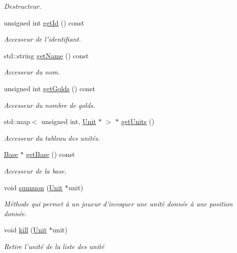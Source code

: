 \begin{DoxyCompactItemize}
\begin{DoxyCompactList}\small\item\em Destructeur. \end{DoxyCompactList}\item 
unsigned int \hyperlink{classPlayer_a6e7e67674bf8f2896cff3ef7f4fa7e0d}{get\+Id} () const 
\begin{DoxyCompactList}\small\item\em Accesseur de l'identifiant. \end{DoxyCompactList}\item 
std\+::string \hyperlink{classPlayer_ad4c6a95f1cf69c44d0c585465b101c70}{get\+Name} () const 
\begin{DoxyCompactList}\small\item\em Accesseur du nom. \end{DoxyCompactList}\item 
unsigned int \hyperlink{classPlayer_a5a300fd8e477c6d9f19266763970daaf}{get\+Golds} () const 
\begin{DoxyCompactList}\small\item\em Accesseur du nombre de golds. \end{DoxyCompactList}\item 
std\+::map$<$ unsigned int, \hyperlink{classUnit}{Unit} $\ast$ $>$ $\ast$ \hyperlink{classPlayer_a1184d2d25acc16958d0e7710fe0f00ec}{get\+Units} ()
\begin{DoxyCompactList}\small\item\em Accesseur du tableau des unités. \end{DoxyCompactList}\item 
\hyperlink{classBase}{Base} $\ast$ \hyperlink{classPlayer_a1a3f0608b817489ecce50a53da619270}{get\+Base} () const 
\begin{DoxyCompactList}\small\item\em Accesseur de la base. \end{DoxyCompactList}\item 
void \hyperlink{classPlayer_a8963d12d2c4e47cd073ed9829dd86c79}{summon} (\hyperlink{classUnit}{Unit} $\ast$unit)
\begin{DoxyCompactList}\small\item\em Méthode qui permet à un joueur d'invoquer une unité donnée à une position donnée. \end{DoxyCompactList}\item 
void \hyperlink{classPlayer_a96a07d17d57a83a43c7f639803e02f49}{kill} (\hyperlink{classUnit}{Unit} $\ast$unit)
\begin{DoxyCompactList}\small\item\em Retire l'unité de la liste des unité \end{DoxyCompactList}\item 

\end{DoxyCompactItemize}
